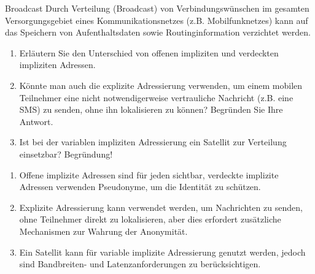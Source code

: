 \documentclass{article}
\begin{document}
\setcounter{subsection}{2229}
\begin{exercise}{Broadcast}
  Durch Verteilung (Broadcast) von Verbindungswünschen im gesamten Versorgungsgebiet eines Kommunikationsnetzes (z.B. Mobilfunknetzes) kann auf das Speichern von Aufenthaltsdaten sowie Routinginformation verzichtet werden.
  \begin{enumerate}
    \item Erläutern Sie den Unterschied von offenen impliziten und verdeckten impliziten Adressen.
    \item Könnte man auch die explizite Adressierung verwenden, um einem mobilen Teilnehmer eine nicht notwendigerweise vertrauliche Nachricht (z.B. eine SMS) zu senden, ohne ihn lokalisieren zu können? Begründen Sie Ihre Antwort.
    \item Ist bei der variablen impliziten Adressierung ein Satellit zur Verteilung einsetzbar? Begründung!
  \end{enumerate}

  \begin{solution}
    \begin{enumerate}
      \item Offene implizite Adressen sind für jeden sichtbar, verdeckte implizite Adressen verwenden Pseudonyme, um die Identität zu schützen.
      \item Explizite Adressierung kann verwendet werden, um Nachrichten zu senden, ohne Teilnehmer direkt zu lokalisieren, aber dies erfordert zusätzliche Mechanismen zur Wahrung der Anonymität.
      \item Ein Satellit kann für variable implizite Adressierung genutzt werden, jedoch sind Bandbreiten- und Latenzanforderungen zu berücksichtigen.
    \end{enumerate}
  \end{solution}
\end{exercise}
\end{document}
